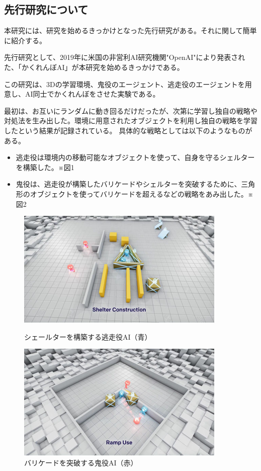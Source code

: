 \documentclass[dvipdfmx]{jsarticle}
\begin{document}
    \subsection{先行研究について}
        本研究には、研究を始めるきっかけとなった先行研究がある。それに関して簡単に紹介する。\par
        先行研究として、2019年に米国の非営利AI研究機関"OpenAI"により発表された、「かくれんぼAI\cite{openAI}」が本研究を始めるきっかけである。\par
        この研究は、3Dの学習環境、鬼役のエージェント、逃走役のエージェントを用意し、AI同士でかくれんぼをさせた実験である。\par 
        最初は、お互いにランダムに動き回るだけだったが、次第に学習し独自の戦略や対処法を生み出した。環境に用意されたオブジェクトを利用し独自の戦略を学習したという結果が記録されている。
        具体的な戦略としては以下のようなものがある。
        \begin{itemize}
            \item 逃走役は環境内の移動可能なオブジェクトを使って、自身を守るシェルターを構築した。※図1
            \item 鬼役は、逃走役が構築したバリケードやシェルターを突破するために、三角形のオブジェクトを使ってバリケードを超えるなどの戦略をあみ出した。※図2
        \end{itemize}
        \begin{figure}[H]
            \begin{minipage}[b]{0.5\linewidth}
                \centering
                \includegraphics[scale=0.4]{images/openAI1.png}
                \caption{シェールターを構築する逃走役AI（青）}
            \end{minipage}
            \begin{minipage}[b]{0.5\linewidth}
                \centering
                \includegraphics[scale=0.4]{images/openAI2.png}
                \caption{バリケードを突破する鬼役AI（赤）}
            \end{minipage}
        \end{figure}
\end{document}
